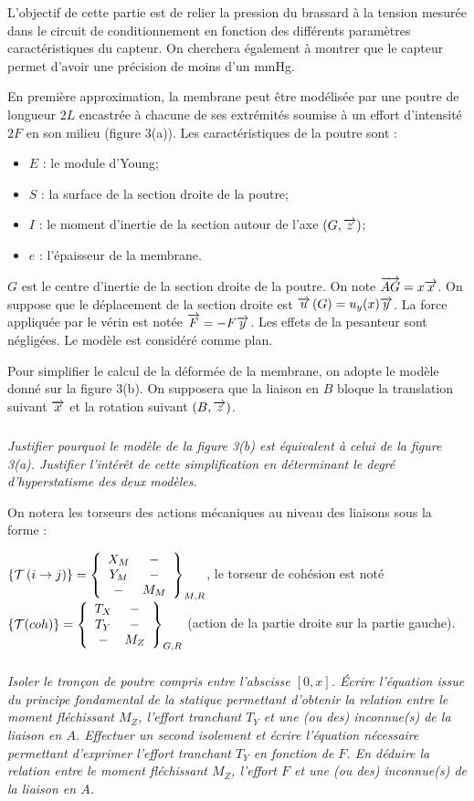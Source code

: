 \documentclass[10pt,fleqn]{article} %
\begin{document}
L'objectif de cette partie est de relier la pression du brassard à la tension mesurée dans le
circuit de conditionnement en fonction des différents paramètres caractéristiques du capteur. On cherchera également à montrer que le capteur permet d'avoir une précision de moins d'un
mmHg.

En première approximation, la membrane peut être modélisée par une poutre de longueur
$2L$ encastrée à chacune de ses extrémités soumise à un effort d'intensité $2F$ en son milieu (figure
3(a)).
Les caractéristiques de la poutre sont :
\begin{itemize}
\item $E$ : le module d'Young;
\item $S$ : la surface de la section droite de la poutre;
\item $I$ : le moment d'inertie de la section autour de l'axe $(G,\vect{z})$;
\item $e$ : l'épaisseur de la membrane.
\end{itemize}

$G$ est le centre d'inertie de la section droite de la poutre.
On note $\vect{AG}=x\vect{x}$. On suppose que le déplacement de la section droite est $\vect{u}\left( G\right) = u_y(x) \vect{y}$.
La force appliquée par le vérin est notée $\vect{F}=-F\vect{y}$. 
Les effets de la pesanteur sont négligées.
Le modèle est considéré comme plan.


Pour simplifier le calcul de la déformée de la membrane, on adopte le modèle donné sur la figure 3(b). On supposera que la liaison en $B$ bloque la translation suivant $\vect{x}$ et la rotation suivant $(B,\vect{z})$.

\subparagraph{}
\textit{Justifier pourquoi le modèle de la figure 3(b) est équivalent à celui de la figure 3(a). Justifier
l'intérêt de cette simplification en déterminant le degré d'hyperstatisme des deux modèles.}

On notera les torseurs des actions mécaniques au niveau des liaisons sous la forme :

$\torseurstat{T}{i}{j}=\torseurcol{X_M}{Y_M}{-}{-}{-}{M_M}{M,R}$, le torseur de cohésion est noté $\left\{\mathcal{T}(coh) \right\}=\torseurcol{T_X}{T_Y}{-}{-}{-}{M_Z}{G,R}$ (action de la partie droite sur la partie gauche).


\subparagraph{}
\textit{Isoler le tronçon de poutre compris entre l'abscisse $[0, x]$. Écrire l'équation issue du principe
fondamental de la statique permettant d'obtenir la relation entre le moment fléchissant $M_Z$,
l'effort tranchant $T_Y$ et une (ou des) inconnue(s) de la liaison en $A$.
Effectuer un second isolement et écrire l'équation nécessaire permettant d'exprimer l'effort
tranchant $T_Y$ en fonction de $F$.
En déduire la relation entre le moment fléchissant $M_Z$, l'effort $F$ et une (ou des) inconnue(s)
de la liaison en $A$.}
\end{document}
